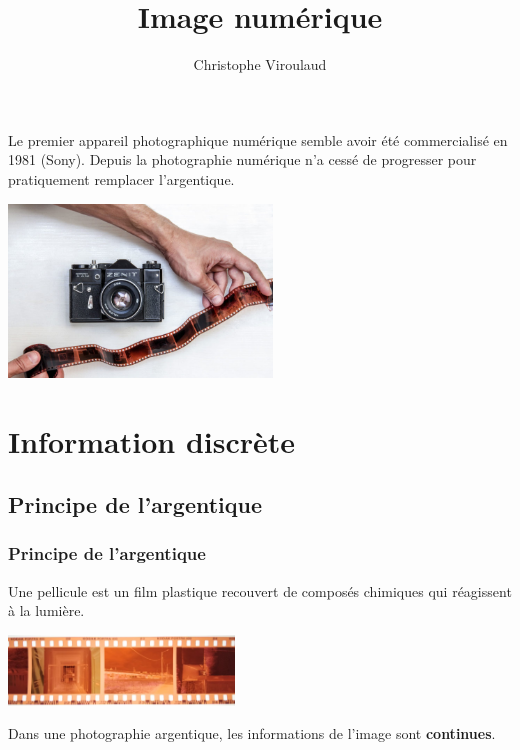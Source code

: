 \documentclass[svgnames,11pt]{beamer}
\author[]{Christophe Viroulaud}
\title{Image numérique}
\date{\framebox{\textbf{Phot 01}}}
\institute{Seconde - SNT}
\begin{document}
\begin{frame}
    \titlepage
\end{frame}
\begin{frame}
    \frametitle{}

    Le premier appareil photographique numérique semble avoir été commercialisé en 1981 (Sony). Depuis la photographie numérique n’a cessé de progresser pour pratiquement remplacer l’argentique.
    \begin{center}
        \centering
        \includegraphics[width=7cm]{ressources/argentique.jpg}
        \label{IMG}
    \end{center}

\end{frame}
\begin{frame}
    \frametitle{}

    \begin{center}
    \end{center}

\end{frame}
\section{Information discrète}
\subsection{Principe de l'argentique}
\begin{frame}
    \frametitle{Principe de l'argentique}
    Une pellicule est un film plastique recouvert de composés chimiques qui réagissent à la lumière.
    \begin{center}
        \centering
        \includegraphics[width=6cm]{ressources/pellicule.jpg}
        \label{IMG}
    \end{center}
    \begin{aretenir}[]
        Dans une photographie argentique, les informations de l'image sont \textbf{continues}.
    \end{aretenir}
\end{frame}
\end{document}
